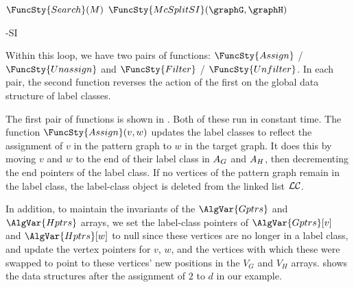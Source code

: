 \begin{algorithm}[htb]
\AlgorithmFontSize
\DontPrintSemicolon
\nl $\FuncSty{Search}(M)$ \;
\nl {}
\;
\nl $\FuncSty{McSplitSI}(\graphG,\graphH)$ \label{McSplitSIFun} \;
\nl {}
\caption{\McSplit-SI}
\label{McSplitSIAlg}
\end{algorithm}

Within this loop, we have two pairs of functions:
$\FuncSty{Assign}$ / $\FuncSty{Unassign}$
and
$\FuncSty{Filter}$ / $\FuncSty{Unfilter}$.  In each pair, the
second function reverses the action of the first on the global
data structure of label classes.

The first pair of functions is shown in .
Both of these run in constant time.
The function $\FuncSty{Assign}(v,w)$ updates the label classes to reflect
the assignment of $v$ in the pattern graph to $w$ in the target graph.  It 
does this by moving $v$ and $w$ to the end of their label class in
$A_G$ and $A_H$, then decrementing the end pointers of the label class.
If no vertices of the pattern graph remain in the label class, the label-class
object is deleted from the linked list $\mathcal{LC}$.

In addition, to maintain the invariants of
the $\AlgVar{Gptrs}$ and $\AlgVar{Hptrs}$ arrays, we set the label-class pointers of
$\AlgVar{Gptrs}[v]$ and $\AlgVar{Hptrs}[w]$ to null since these vertices
are no longer in a label class, and update the vertex pointers
for $v$, $w$, and the vertices with which these were swapped to point to these
vertices' new positions in the $V_G$ and $V_H$ arrays.
 shows the data structures after the assignment
of $2$ to $d$ in our example.

